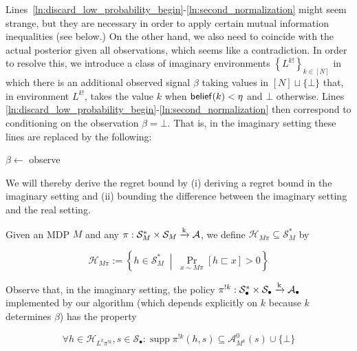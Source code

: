 \documentclass[anon,12pt]{colt2018} %
\DeclareMathOperator{\Supp}{supp}
\newcommand{\AP}[1]{\left(#1\right)}
\newcommand{\AB}[1]{\left[#1\right]}
\newcommand{\AC}[1]{\left\{#1\right\}}
\newcommand{\ACM}[2]{\left\{#1\;\middle\vert\;#2\right\}}
\newcommand{\Pa}[2]{\underset{#1}{\operatorname{Pr}}\AB{#2}}
\newcommand{\K}{\xrightarrow{\textnormal{k}}}
\newcommand{\A}{\mathcal{A}}
\newcommand{\St}{\mathcal{S}}
\newcommand{\FH}{\mathcal{H}}
\newcommand{\Rev}{\beta}
\newcommand{\X}{\bullet}
\newcommand{\IP}{\pi^{!k}}
\begin{document}
Lines~\ref{ln:discard_low_probability_begin}-\ref{ln:second_normalization} might seem strange, but they are necessary in order to apply certain mutual information inequalities (see below.) On the other hand, we also need \Z to coincide with the actual posterior given all observations, which seems like a contradiction. In order to resolve this, we introduce a class of imaginary environments $\AC{L^{k!}}_{k\in[N]}$ in which there is an additional observed signal $\Rev$ taking values in $[N]\sqcup\{\bot\}$ that, in environment $L^{k!}$, takes the value $k$ when $\DataSty{belief}(k) < \eta$ and $\bot$ otherwise. Lines \ref{ln:discard_low_probability_begin}-\ref{ln:second_normalization} then correspond to conditioning \Z on the observation $\beta=\bot$. That is, in the imaginary setting these lines are replaced by the following:

\begin{algorithm}[h]

\setcounter{AlgoLine}{32}

$\beta\leftarrow$ observe

\eIf{$\beta = \bot$}{
        \For{$k=0$ \KwTo $N-1$}{
                \If{$\Z(k) < \eta$}{
                        $\Z(k) \leftarrow 0$\label{ln:beta__discard}
                }
        }
        \Z$\leftarrow\AP{\sum_{k=0}^{N-1}\Z(k)}^{-1}\cdot\Z$\;
}{
        \Z$ \leftarrow \boldsymbol{0}$\;
        $\Z(\beta) \leftarrow 1$\;
}

\end{algorithm}

We will thereby derive the regret bound by (i) deriving a regret bound in the imaginary setting and (ii) bounding the difference between the imaginary setting and the real setting.

Given an MDP $M$ and any $\pi: \St_M^* \times \St_M \K \A$, we define $\FH_{M\pi} \subseteq \St_M^*$ by

\begin{equation}
\FH_{M\pi} := \ACM{h \in \St_M^*}{\Pa{x\sim M\pi}{h \sqsubset x} > 0}
\end{equation}

Observe that, in the imaginary setting, the policy $\IP: \St_\X^* \times \St_\X \K \A_\X$ implemented by our algorithm (which depends explicitly on $k$ because $k$ determines $\beta$) has the property

\begin{equation}
\forall h\in\FH_{L^k\pi^{!k}},s\in\St_\X: \Supp{\IP(h,s)} \subseteq \A_{M^k}^0(s)\cup\{\bot\}
\end{equation}
\end{document}
